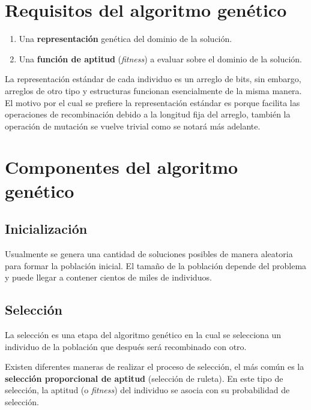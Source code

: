 \section{Requisitos del algoritmo gen\'etico}

\begin{enumerate}
  \item Una \textbf{representación} genética del dominio de la solución.
  \item Una \textbf{función de aptitud} (\textit{fitness}) a evaluar sobre el dominio de la solución.
\end{enumerate}

\noindent La representación estándar de cada individuo es un arreglo de bits, sin embargo, arreglos de otro tipo y estructuras funcionan esencialmente de la misma manera. El motivo por el cual se prefiere la representación estándar es porque facilita las operaciones de recombinación debido a la longitud fija del arreglo, también la operación de mutación se vuelve trivial como se notará más adelante.


\section{Componentes del algoritmo gen\'etico}

\subsection{Inicializaci\'on}

Usualmente se genera una cantidad de soluciones posibles de manera aleatoria para formar la población inicial. El tamaño de la población depende del problema y puede llegar a contener cientos de miles de individuos.

\subsection{Selecci\'on}

La selección es una etapa del algoritmo genético en la cual se selecciona un individuo de la población que después será recombinado con otro.\par

Existen diferentes maneras de realizar el proceso de selección, el más común es la \textbf{selección proporcional de aptitud} (selección de ruleta). En este tipo de selección, la aptitud (o \textit{fitness}) del individuo se asocia con su probabilidad de selección.\par

